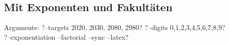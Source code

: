 \documentclass{article}
\theoremstyle{nonumberplain}
\newcommand{\nldelims}[1]{\right.#1\left.}
\newcommand{\mnl}{\nldelims{\newline}}
\begin{document}
\subsection{Mit Exponenten und Fakultäten}

Argumente:
?--targets 2020, 2030, 2080, 2980?
?--digits 0,1,2,3,4,5,6,7,8,9?\\
?--exponentiation --factorial --sync --latex?

\end{document}
